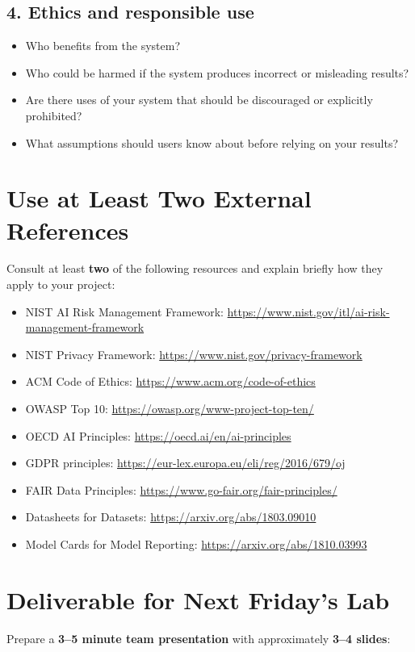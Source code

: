 \documentclass[12pt]{article}
\begin{document}
\subsection*{4. Ethics and responsible use}
\begin{itemize}
  \item Who benefits from the system?
  \item Who could be harmed if the system produces incorrect or misleading results?
  \item Are there uses of your system that should be discouraged or explicitly prohibited?
  \item What assumptions should users know about before relying on your results?
\end{itemize}

\section*{Use at Least Two External References}
Consult at least \textbf{two} of the following resources and explain briefly how they apply to your project:

\begin{itemize}
  \item NIST AI Risk Management Framework: \url{https://www.nist.gov/itl/ai-risk-management-framework}
  \item NIST Privacy Framework: \url{https://www.nist.gov/privacy-framework}
  \item ACM Code of Ethics: \url{https://www.acm.org/code-of-ethics}
  \item OWASP Top 10: \url{https://owasp.org/www-project-top-ten/}
  \item OECD AI Principles: \url{https://oecd.ai/en/ai-principles}
  \item GDPR principles: \url{https://eur-lex.europa.eu/eli/reg/2016/679/oj}
  \item FAIR Data Principles: \url{https://www.go-fair.org/fair-principles/}
  \item Datasheets for Datasets: \url{https://arxiv.org/abs/1803.09010}
  \item Model Cards for Model Reporting: \url{https://arxiv.org/abs/1810.03993}
\end{itemize}

\section*{Deliverable for Next Friday's Lab}
Prepare a \textbf{3--5 minute team presentation} with approximately \textbf{3--4 slides}:
\end{document}
